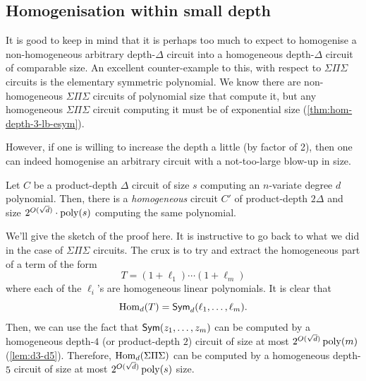 \subsection{Homogenisation within small depth}

It is good to keep in mind that it is perhaps too much to expect to homogenise a non-homogeneous  arbitrary depth-$\Delta$ circuit into a homogeneous depth-$\Delta$ circuit of comparable size. An excellent counter-example to this, with respect to $\Sigma\Pi\Sigma$ circuits is the elementary symmetric polynomial. We know there are non-homogeneous $\Sigma\Pi\Sigma$ circuits of polynomial size that compute it, but any homogeneous $\Sigma\Pi\Sigma$ circuit computing it must be of exponential size (\autoref{thm:hom-depth-3-lb-esym}). 

However, if one is willing to increase the depth a little (by factor of 2), then one can indeed homogenise an arbitrary circuit with a not-too-large blow-up in size.

\begin{lemma}\label{homogenisation-within-constant-depth}
  Let $C$ be a product-depth $\Delta$ circuit of size $s$ computing an $n$-variate degree $d$ polynomial. Then, there is a \emph{homogeneous} circuit $C'$ of product-depth $2\Delta$ and size $2^{O(\sqrt{d})} \cdot \operatorname{poly}(s)$ computing the same polynomial. 
\end{lemma}

We'll give the sketch of the proof here. It is instructive to go back to what we did in the case of $\Sigma\Pi\Sigma$ circuits. The crux is to try and extract the homogeneous part of a term of the form
\[
  T = (1 + \ell_1)\cdots (1 + \ell_m)
\]
where each of the $\ell_i$'s are homogeneous linear polynomials. It is clear that
\[
  \operatorname{Hom}_{d}(T) = \operatorname{\mathsf{Sym}}_d(\ell_1,\ldots, \ell_m).
\]
Then, we can use the fact that $\operatorname{\mathsf{Sym}}(z_1,\ldots, z_m)$ can be computed by a homogeneous depth-$4$ (or product-depth $2$) circuit of size at most $2^{O(\sqrt{d})}\operatorname{poly}(m)$ (\autoref{lem:d3-d5}). Therefore, $\operatorname{Hom}_d(\Sigma\Pi\Sigma)$ can be computed by a homogeneous depth-$5$ circuit of size at most $2^{O(\sqrt{d})}\operatorname{poly}(s)$  size.

